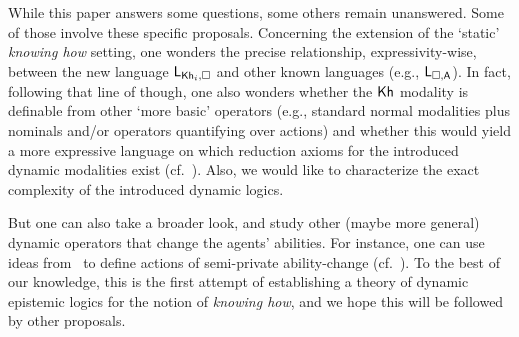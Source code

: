 While this paper answers some questions, some others remain unanswered. Some of those involve these specific proposals. 
Concerning the extension of the `static' \emph{knowing how} setting, one wonders the precise relationship, expressivity-wise, between the new language $\mathsf{L}_{{\sf Kh}_i,\square}$ and other known languages (e.g., $\mathsf{L}_{\square,{\sf A}}$). In fact, following that line of though, one also wonders whether the ${\sf Kh}$ modality is definable from other `more basic' operators (e.g., standard normal modalities plus nominals and/or operators quantifying over actions) and whether this would yield a more expressive language on which reduction axioms for the introduced dynamic modalities exist (cf.~\cite{BenthemMZ2022}). Also, we would like to characterize the exact complexity of the introduced dynamic logics.

But one can also take a broader look, and study other (maybe more general) dynamic operators that change the agents' abilities. For instance, one can use ideas from~\cite{BaltagMS98} to define actions of semi-private ability-change (cf.~\cite{GalimullinA22}). To the best of our knowledge, this is the first attempt of establishing a theory of dynamic epistemic logics for the notion of \emph{knowing how}, and we hope this will be followed by other proposals.
 
